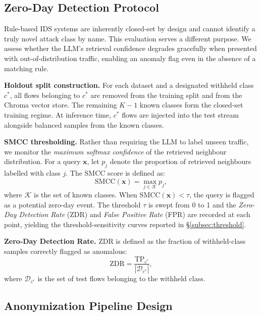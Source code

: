 \subsection{Zero-Day Detection Protocol}\label{subsec:zeroday}

Rule-based IDS systems are inherently closed-set by design and cannot identify
a truly novel attack class by name. This evaluation serves a different purpose.
We assess whether the LLM's retrieval confidence degrades gracefully when
presented with out-of-distribution traffic, enabling an anomaly flag even in
the absence of a matching rule.

\textbf{Holdout split construction.} For each dataset and a designated withheld
class $c^{*}$, all flows belonging to $c^{*}$ are removed from the training
split and from the Chroma vector store. The remaining $K-1$ known classes form
the closed-set training regime. At inference time, $c^{*}$ flows are injected
into the test stream alongside balanced samples from the known classes.

\textbf{SMCC thresholding.} Rather than requiring the LLM to label unseen
traffic, we monitor the \emph{maximum softmax confidence} of the retrieved
neighbour distribution. For a query $\mathbf{x}$, let $p_j$ denote the
proportion of retrieved neighbours labelled with class $j$. The SMCC score is
defined as:
\[
  \mathrm{SMCC}(\mathbf{x}) = \max_{j \in \mathcal{K}} p_j ,
\]
where $\mathcal{K}$ is the set of known classes. When
$\mathrm{SMCC}(\mathbf{x}) < \tau$, the query is flagged as a potential
zero-day event. The threshold $\tau$ is swept from 0 to 1 and the
\emph{Zero-Day Detection Rate} (ZDR) and \emph{False Positive Rate} (FPR) are
recorded at each point, yielding the threshold-sensitivity curves
reported in \S\ref{subsec:threshold}.

\textbf{Zero-Day Detection Rate.} ZDR is defined as the fraction of withheld-class
samples correctly flagged as anomalous:
\[
  \mathrm{ZDR} = \frac{\text{TP}_{c^{*}}}{\left| \mathcal{D}_{c^{*}} \right|} ,
\]
where $\mathcal{D}_{c^{*}}$ is the set of test flows belonging to the withheld
class.

\subsection{Anonymization Pipeline Design}\label{subsec:anon}

